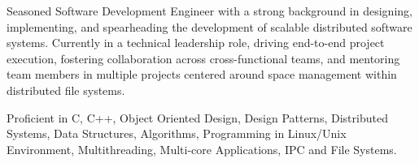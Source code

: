 

\begin{cvparagraph}

 Seasoned Software Development Engineer with a strong background in designing, implementing, and spearheading the development of scalable distributed software systems. Currently in a technical leadership role, driving end-to-end project execution, fostering collaboration across cross-functional teams, and mentoring team members in multiple projects centered around space management within distributed file systems.

 Proficient in C, C++, Object Oriented Design, Design Patterns, Distributed Systems, Data Structures, Algorithms, Programming in Linux/Unix Environment, Multithreading, Multi-core Applications, IPC and File Systems.
\end{cvparagraph}
